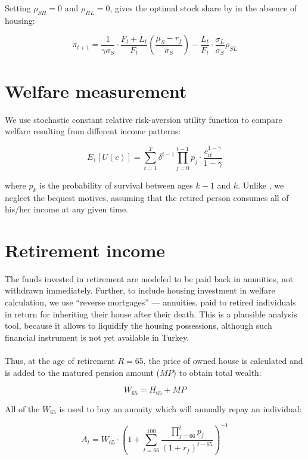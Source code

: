Setting $\rho_{SH} = 0$ and $\rho_{HL} = 0$, gives the optimal stock share by \citet{munk} in the absence of housing:

\begin{equation}\label{eq:munkno}
	\pi_{t+1} = \frac{1}{\gamma \sigma_S} \cdot \frac{F_t + L_t}{F_t} \left( \frac{\mu_S - r_f}{\sigma_S} \right) - \frac{L_t}{F_t} \cdot \frac{\sigma_L}{\sigma_S} \rho_{SL}
\end{equation}


\section{Welfare measurement}

We use stochastic constant relative risk-aversion utility function to compare welfare resulting from different income patterns:

\begin{equation}
	E_1[U(c)] = \displaystyle\sum^T_{t=1} \delta^{t-1} \displaystyle\prod^{t-1}_{j=0} p_j \cdot \frac{c^{1-\gamma}_{it}}{1-\gamma}
\end{equation}

where $p_k$ is the probability of survival between ages $k-1$ and $k$. Unlike \citet{cgm}, we neglect the bequest motives, assuming that the retired person consumes all of his/her income at any given time. 


\section{Retirement income}

The funds invested in retirement are modeled to be paid back in annuities, not withdrawn immediately. Further, to include housing investment in welfare calculation, we use ``reverse mortgages'' --- annuities, paid to retired individuals in return for inheriting their house after their death. This is a plausible analysis tool, because it allows to liquidify the housing possessions, although such financial instrument is not yet available in Turkey. 

\paragraph{}Thus, at the age of retirement $R = 65$, the price of owned house is calculated and is added to the matured pension amount ($MP$) to obtain total wealth:

\begin{equation}
	W_{65} = H_{65} + MP
\end{equation}

All of the $W_{65}$ is used to buy an annuity which will annually repay an individual:

\begin{equation}
	A_t = W_{65} \cdot \left(1+\sum^{100}_{t=66} \frac{\prod^{t}_{j=66} p_j }{(1+r_f)^{t-65}} \right)^{-1}
\end{equation}
